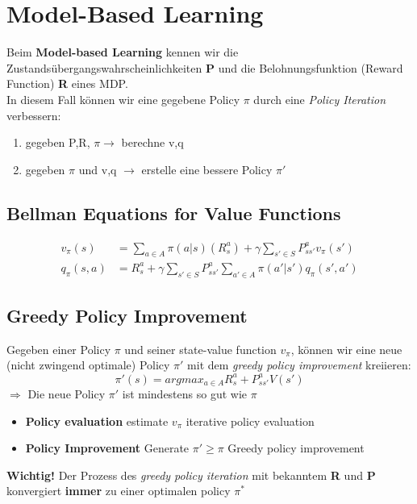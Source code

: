 \documentclass{article}
\theoremstyle{merke}
\theoremstyle{definition}
\begin{document}
    \section{Model-Based Learning}
    Beim \textbf{Model-based Learning} kennen wir die Zustandsübergangswahrscheinlichkeiten \textbf{P} und die Belohnungsfunktion (Reward Function) \textbf{R} eines MDP.\\
    In diesem Fall können wir eine gegebene Policy $\pi$ durch eine \textit{Policy Iteration} verbessern:
    \begin{enumerate}
        \item gegeben P,R, $\pi \rightarrow$ berechne v,q
        \item gegeben $\pi$ und v,q $\rightarrow$ erstelle eine bessere Policy $\pi'$
    \end{enumerate}

        \subsection{Bellman Equations for Value Functions}
    \begin{equation}
        \begin{split}
            v_\pi(s) &= \sum_{a \in A} \pi(a|s) (R^a_s) + \gamma \sum_{s' \in S} P^a_{ss'}v_\pi(s') \\
            q_\pi(s,a) &= R^a_s + \gamma \sum_{s'\in S} P^a_{ss'} \sum_{a' \in A} \pi(a'|s') q_\pi(s', a')
        \end{split}
    \end{equation}

        \subsection{Greedy Policy Improvement}
        Gegeben einer Policy $\pi$ und seiner state-value function $v_\pi$, können wir eine neue (nicht zwingend optimale) Policy $\pi'$  mit dem \textit{greedy policy improvement} kreiieren:
        \begin{equation}
            \pi' (s) = argmax_{a \in A} R^a_s + P^a_{ss'} V(s')
        \end{equation}
        $\Rightarrow$ Die neue Policy $\pi'$ ist mindestens so gut wie $\pi$
        
        \begin{itemize}
            \item \textbf{Policy evaluation} estimate $v_\pi$ iterative policy evaluation
            \item \textbf{Policy Improvement} Generate $\pi' \geq \pi$ Greedy policy improvement
        \end{itemize}
        \textbf{Wichtig!} Der Prozess des \textit{greedy policy iteration} mit bekanntem \textbf{R} und \textbf{P} konvergiert \textbf{immer} zu einer optimalen policy $\pi^*$
        
\end{document}
